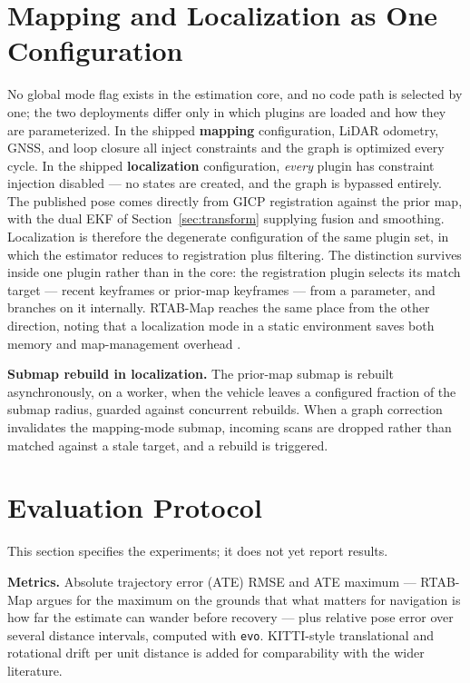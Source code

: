 \documentclass[conference]{IEEEtran}
\begin{document}
\section{Mapping and Localization as One Configuration}
\label{sec:modes}
No global mode flag exists in the estimation core, and no code path is selected by one; the two deployments differ only in which plugins are loaded and how they are parameterized. In the shipped \textbf{mapping} configuration, LiDAR odometry, GNSS, and loop closure all inject constraints and the graph is optimized every cycle. In the shipped \textbf{localization} configuration, \emph{every} plugin has constraint injection disabled --- no states are created, and the graph is bypassed entirely. The published pose comes directly from GICP registration against the prior map, with the dual EKF of Section~\ref{sec:transform} supplying fusion and smoothing. Localization is therefore the degenerate configuration of the same plugin set, in which the estimator reduces to registration plus filtering. The distinction survives inside one plugin rather than in the core: the registration plugin selects its match target --- recent keyframes or prior-map keyframes --- from a parameter, and branches on it internally. RTAB-Map reaches the same place from the other direction, noting that a localization mode in a static environment saves both memory and map-management overhead \parencite{labbe2019rtabmap}.

\textbf{Submap rebuild in localization.} The prior-map submap is rebuilt asynchronously, on a worker, when the vehicle leaves a configured fraction of the submap radius, guarded against concurrent rebuilds. When a graph correction invalidates the mapping-mode submap, incoming scans are dropped rather than matched against a stale target, and a rebuild is triggered.

\section{Evaluation Protocol}
\label{sec:eval}
This section specifies the experiments; it does not yet report results.

\textbf{Metrics.} Absolute trajectory error (ATE) RMSE and ATE maximum --- RTAB-Map argues for the maximum on the grounds that what matters for navigation is how far the estimate can wander before recovery \parencite{labbe2019rtabmap} --- plus relative pose error over several distance intervals, computed with \texttt{evo}. KITTI-style \parencite{geiger2012kitti} translational and rotational drift per unit distance is added for comparability with the wider literature.
\end{document}
